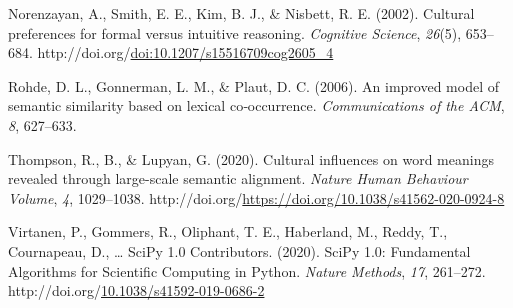 \documentclass[10pt, letterpaper]{article}
\newenvironment{CSLReferences}%
  {}%
  {\par}
\begin{document}
\begin{CSLReferences}{1}{0}
\leavevmode{}%
Norenzayan, A., Smith, E. E., Kim, B. J., \& Nisbett, R. E. (2002).
Cultural preferences for formal versus intuitive reasoning.
\emph{Cognitive Science}, \emph{26}(5), 653--684.
http://doi.org/\href{https://doi.org/doi:10.1207/s15516709cog2605_4}{doi:10.1207/s15516709cog2605\_4}

\leavevmode{}%
Rohde, D. L., Gonnerman, L. M., \& Plaut, D. C. (2006). An improved
model of semantic similarity based on lexical co‐occurrence.
\emph{Communications of the ACM}, \emph{8}, 627--633.

\leavevmode{}%
Thompson, R., B., \& Lupyan, G. (2020). Cultural influences on word
meanings revealed through large-scale semantic alignment. \emph{Nature
Human Behaviour Volume}, \emph{4}, 1029--1038.
http://doi.org/\url{https://doi.org/10.1038/s41562-020-0924-8}

\leavevmode{}%
Virtanen, P., Gommers, R., Oliphant, T. E., Haberland, M., Reddy, T.,
Cournapeau, D., \ldots{} SciPy 1.0 Contributors. (2020). {{SciPy} 1.0:
Fundamental Algorithms for Scientific Computing in Python}. \emph{Nature
Methods}, \emph{17}, 261--272.
http://doi.org/\href{https://doi.org/10.1038/s41592-019-0686-2}{10.1038/s41592-019-0686-2}

\end{CSLReferences}


\end{document}
